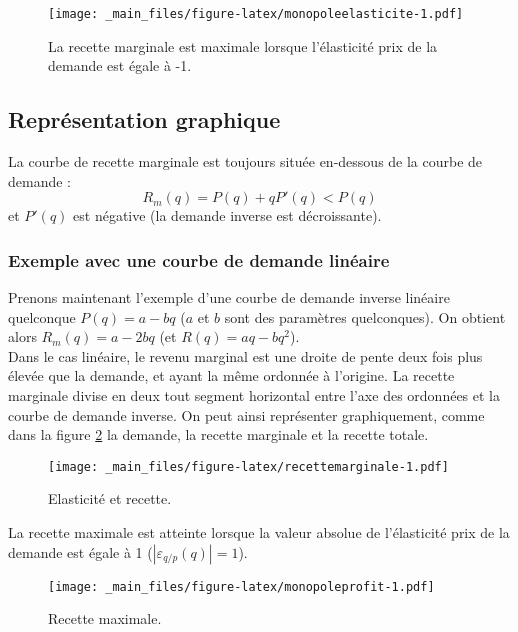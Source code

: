 \documentclass[
]{book}
\theoremstyle{definition}
\theoremstyle{definition}
\theoremstyle{definition}
\theoremstyle{definition}
\theoremstyle{remark}
\begin{document}
\begin{figure}
\centering
\texttt{[image: \_main\_files/figure-latex/monopoleelasticite-1.pdf]}
\caption{\label{fig:monopoleelasticite}La recette marginale est maximale lorsque l'élasticité prix de la demande est égale à -1.}
\end{figure}

\hypertarget{repruxe9sentation-graphique}{%
\subsection{Représentation graphique}\label{repruxe9sentation-graphique}}

La courbe de recette marginale est toujours située en-dessous de la courbe de demande :
\[
R_m(q) = P(q) + qP'(q) < P(q)
\]
et \(P'(q)\) est négative (la demande inverse est décroissante).

\hypertarget{exemple-avec-une-courbe-de-demande-linuxe9aire}{%
\subsubsection{Exemple avec une courbe de demande linéaire}\label{exemple-avec-une-courbe-de-demande-linuxe9aire}}

Prenons maintenant l'exemple d'une courbe de demande inverse linéaire quelconque \(P(q) = a-bq\) (\(a\) et \(b\) sont des paramètres quelconques).
On obtient alors \(R_m(q) = a-2bq\) (et \(R(q) = aq-bq^2\)).\\
Dans le cas linéaire, le revenu marginal est une droite de pente deux fois plus élevée que la demande, et ayant la même ordonnée à l'origine.
La recette marginale divise en deux tout segment horizontal entre l'axe des ordonnées et la courbe de demande inverse.
On peut ainsi représenter graphiquement, comme dans la figure \ref{fig:recettemarginale} la demande, la recette marginale et la recette totale.

\begin{figure}
\centering
\texttt{[image: \_main\_files/figure-latex/recettemarginale-1.pdf]}
\caption{\label{fig:recettemarginale}Elasticité et recette.}
\end{figure}

La recette maximale est atteinte lorsque la valeur absolue de l'élasticité prix de la demande est égale à 1 (\(|\varepsilon_{q/p}(q)|=1\)).

\begin{figure}
\centering
\texttt{[image: \_main\_files/figure-latex/monopoleprofit-1.pdf]}
\caption{\label{fig:monopoleprofit}Recette maximale.}
\end{figure}
\end{document}
